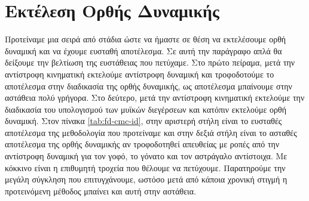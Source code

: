 \section{Εκτέλεση Ορθής Δυναμικής}

Προτείναμε μια σειρά από στάδια ώστε να ήμαστε σε θέση να εκτελέσουμε ορθή δυναμική και να έχουμε ευσταθή αποτέλεσμα. Σε αυτή την παράγραφο απλά θα δείξουμε την βελτίωση της ευστάθειας που πετύχαμε. Στο πρώτο πείραμα, μετά την αντίστροφη κινηματική εκτελούμε αντίστροφη δυναμική και τροφοδοτούμε το αποτέλεσμα στην διαδικασία της ορθής δυναμικής, ως αποτέλεσμα μπαίνουμε στην αστάθεια πολύ γρήγορα. Στο δεύτερο, μετά την αντίστροφη κινηματική εκτελούμε την διαδικασία του υπολογισμού των μυϊκών διεγέρσεων και κατόπιν εκτελούμε ορθή δυναμική. Στον πίνακα \ref{tab:fd-cmc-id}, στην αριστερή στήλη είναι το ευσταθές αποτέλεσμα της μεθοδολογία που προτείναμε και στην δεξιά στήλη είναι το ασταθές αποτέλεσμα της ορθής δυναμικής αν τροφοδοτηθεί απευθείας με ροπές από την αντίστροφη δυναμική για τον γοφό, το γόνατο και τον αστράγαλο αντίστοιχα. Με κόκκινο είναι η επιθυμητή τροχεία που θέλουμε να πετύχουμε. Παρατηρούμε την μεγάλη σύγκληση που επιτυγχάνουμε, ωστόσο μετά από κάποια χρονική στιγμή η προτεινόμενη μέθοδος μπαίνει και αυτή στην αστάθεια.

